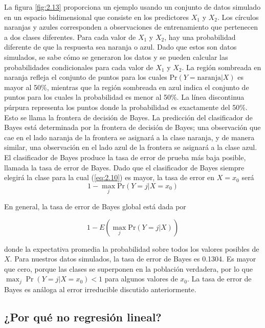 La figura \ref{fig:2.13} proporciona un ejemplo usando un conjunto de datos simulado en un espacio bidimensional que consiste en los predictores $X_1$ y $X_2$. Los círculos naranjas y azules corresponden a observaciones de entrenamiento que pertenecen a dos clases diferentes. Para cada valor de $X_1$ y $X_2$, hay una probabilidad diferente de que la respuesta sea naranja o azul. Dado que estos son datos simulados, se sabe cómo se generaron los datos y se pueden calcular las probabilidades condicionales para cada valor de $X_1$ y $X_2$. La región sombreada en naranja refleja el conjunto de puntos para los cuales $\text{Pr}(Y = \text{naranja} | X)$ es mayor al 50\%, mientras que la región sombreada en azul indica el conjunto de puntos para los cuales la probabilidad es menor al 50\%. La línea discontinua púrpura representa los puntos donde la probabilidad es exactamente del 50\%. Esto se llama la frontera de decisión de Bayes. La predicción del clasificador de Bayes está determinada por la frontera de decisión de Bayes; una observación que cae en el lado naranja de la frontera se asignará a la clase naranja, y de manera similar, una observación en el lado azul de la frontera se asignará a la clase azul. \\

El clasificador de Bayes produce la tasa de error de prueba más baja posible, llamada la tasa de error de Bayes. Dado que el clasificador de Bayes siempre elegirá la clase para la cual (\ref{eq:2.10}) es mayor, la tasa de error en $X = x_0$ será 
\begin{equation}
1 - \max_j \text{Pr}(Y = j | X = x_0)
\end{equation}

\noindent En general, la tasa de error de Bayes global está dada por

\begin{equation}
1 - E\left(\max_j \text{Pr}(Y = j | X)\right)
\end{equation}

\noindent donde la expectativa promedia la probabilidad sobre todos los valores posibles de $X$. Para nuestros datos simulados, la tasa de error de Bayes es 0.1304. Es mayor que cero, porque las clases se superponen en la población verdadera, por lo que $\max_j \Pr(Y = j | X = x_0) < 1$ para algunos valores de $x_0$. La tasa de error de Bayes es análoga al error irreducible discutido anteriormente.

\subsection{¿Por qué no regresión lineal?}

